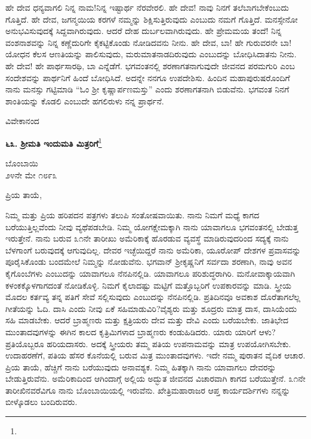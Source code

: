 ಹೇ ದೇವ ಧನ್ಯವಾಗಲಿ ನಿನ್ನ ನಾಮ!ನಿನ್ನ ಇಷ್ಟಾರ್ಥ ನೆರವೇರಲಿ. ಹೇ ದೇವ! ನಾವು ನಿನಗೆ ತಲೆಬಾಗಬೇಕೆಂಬುದು ಗೊತ್ತಿದೆ. ಹೇ ದೇವ, ಜಗನ್ಮಯಿಯ ಕರಗಳೆ ನಮ್ಮನ್ನು ಶಿಕ್ಷಿಸುತ್ತಿರುವುದು ಎಂಬುದು ನಮಗೆ ಗೊತ್ತಿದೆ. ಮನಸ್ಸೇನೋ ಅನುಭವಿಸುವುದಕ್ಕೆ ಸಿದ್ದವಾಗಿರುವುದು. ಆದರೆ ದೇಹ ದುರ್ಬಲವಾಗಿರುವುದು. ಹೇ ಪ್ರೇಮಮಯ ತಂದೆ! ನಿನ್ನ ವಂಶನಾಶವನ್ನು ನಿನ್ನ ಕಣ್ಣೆದುರಿಗೇ ಕೈಕಟ್ಟಿಕೊಂಡು ನೋಡಿದವನು ನೀನು. ಹೇ ದೇವ, ಬಾ! ಹೇ ಗುರುವರನೇ ಬಾ! ಯೋಧನ ಕೆಲಸ ಆಣತಿಯನ್ನು ಪಾಲಿಸುವುದು, ಮರುಮಾತನಾಡದಿರುವುದು ಎಂಬುದನ್ನು ಬೋಧಿಸಿದಾತನು ನೀನು. ಹೇ ದೇವ! ಹೇ ಪಾರ್ಥಸಾರಥಿ, ಬಾ ಎನ್ನೆಡೆಗೆ. ಭಗವಂತನಲ್ಲಿ ಶರಣಾಗತನಾಗುವುದೇ ಜೀವನದ ಪರಮಗುರಿ ಎಂಬ ಸಂದೇಶವನ್ನು ಪಾರ್ಥನಿಗೆ ಹಿಂದೆ ಬೋಧಿಸಿದೆ. ಅದನ್ನೇ ನನಗೂ ಉಪದೇಶಿಸು. ಹಿಂದಿನ ಮಹಾಪುರುಷರೊಂದಿಗೆ ನಾನು ಮನಸ್ಸು ಗಟ್ಟಿಮಾಡಿ “ಓಂ ಶ‍್ರೀ ಕೃಷ್ಣಾರ್ಪಣಮಸ್ತು'' ಎಂದು ಶರಣಾಗತನಾಗಿ ಬಿಡುವೆನು. ಭಗವಂತ ನಿನಗೆ ಶಾಂತಿಯನ್ನು ಕೊಡಲಿ ಎಂಬುದೇ ಹಗಲಿರುಳು ನನ್ನ ಪ್ರಾರ್ಥನೆ.

\vspace{-0.55cm}

{\flushright
ವಿವೇಕಾನಂದ\par}

\begin{center}
\textbf{೬೩. ಶ‍್ರೀಮತಿ ಇಂದುಮತಿ ಮಿತ್ರರಿಗೆ}\footnote{}
\end{center}

\vspace{-0.75cm}

\begin{flushright}
ಬೊಂಬಾಯಿ\\೨೪ನೇ ಮೇ ೧೮೯೩
\end{flushright}

\noindent
ಪ್ರಿಯ ತಾಯೆ,

ನಿಮ್ಮ ಮತ್ತು ಪ್ರಿಯ ಹರಿಪದನ ಪತ್ರಗಳು ತಲುಪಿ ಸಂತೋಷವಾಯಿತು. ನಾನು ನಿಮಗೆ ಮಧ್ಯೆ ಕಾಗದ ಬರೆಯುತ್ತಿಲ್ಲವೆಂದು ನೀವು ವ್ಯಥೆಪಡಬೇಡಿ. ನಿಮ್ಮ ಯೋಗಕ್ಷೇಮಕ್ಕಾಗಿ ನಾನು ಯಾವಾಗಲೂ ಭಗವಂತನಲ್ಲಿ ಬೇಡುತ್ತ ಇರುತ್ತೇನೆ. ನಾನು ಬರುವ ೩೧ನೇ ತಾರೀಖು ಅಮೆರಿಕಾಕ್ಕೆ ಹೊರಡುವ ವ್ಯವಸ್ಥೆ ಮಾಡಿರುವುದರಿಂದ ಸದ್ಯಕ್ಕೆ ನಾನು ಬೆಳಗಾಂಗೆ ಬರುವುದಕ್ಕೆ ಆಗುವುದಿಲ್ಲ. ದೇವರ ಇಚ್ಛೆಯಿದ್ದರೆ ನಾನು ಅಮೆರಿಕಾ, ಯೂರೋಪ್ ದೇಶಗಳ ಪ್ರವಾಸವನ್ನು ಪೂರೈಸಿಕೊಂಡು ಬಂದಮೇಲೆ ನಿಮ್ಮನ್ನು ನೋಡುವೆನು. ಭಗವಾನ್ ಶ‍್ರೀಕೃಷ್ಣನಿಗೆ ಸರ್ವದಾ ಶರಣಾಗಿ, ನಾವು ಅವನ ಕೈಗೊಂಬೆಗಳು ಎಂಬುದನ್ನು ಯಾವಾಗಲೂ ನೆನಪಿನಲ್ಲಿಡಿ. ಯಾವಾಗಲೂ ಪರಿಶುದ್ಧರಾಗಿರಿ. ಮನೋವಾಕ್ಕಾಯವಾಗಿ ಕಳಂಕಕ್ಕೊಳಗಾಗದಂತೆ ನೋಡಿಕೊಳ್ಳಿ. ನಿಮಗೆ ಕೈಲಾದಷ್ಟು ಮಟ್ಟಿಗೆ ಮತ್ತೊಬ್ಬರಿಗೆ ಉಪಕಾರವನ್ನು ಮಾಡಿ. ಸ್ತ್ರೀಯ ಮೊದಲ ಕರ್ತವ್ಯ ತನ್ನ ಪತಿಗೆ ಸೇವೆ ಸಲ್ಲಿಸುವುದು ಎಂಬುದನ್ನು ನೆನಪಿನಲ್ಲಿಡಿ. ಪ್ರತಿದಿನವೂ ಅವಕಾಶ ದೊರೆತಾಗಲೆಲ್ಲ ಗೀತೆಯನ್ನು ಓದಿ. ದಾಸಿ ಎಂದು ನೀವು ಏಕೆ ಸಹಿಮಾಡುವಿರಿ?ವೈಶ್ಯರು ಮತ್ತು ಶೂದ್ರರು ಮಾತ್ರ ದಾಸ, ದಾಸಿಯೆಂದು ಸಹಿ ಮಾಡಬೇಕು. ಆದರೆ ಬ್ರಾಹ್ಮಣರು ಮತ್ತು ಕ್ಷತ್ರಿಯರು ದೇವ ಮತ್ತು ದೇವಿ ಎಂದು ಬರೆಯಬೇಕು. ಜಾತಿಭೇದ ಮುಂತಾದವುಗಳನ್ನು ಈಗಿನ ಕಾಲದ ಕೃತ್ರಿಮಿಗಳಾದ ಬ್ರಾಹ್ಮಣರು ಕಂಡುಹಿಡಿದರು. ಯಾರು ಯಾರಿಗೆ ಆಳು? ಪ್ರತಿಯೊಬ್ಬರೂ ಹರಿಯದಾಸರು. ಅದಕ್ಕೆ ಸ್ತ್ರೀಯರು ತಮ್ಮ ಪತಿಯ ಉಪನಾಮವನ್ನು ಮಾತ್ರ ಉಪಯೋಗಿಸಬೇಕು. ಉದಾಹರಣೆಗೆ, ಪತಿಯ ಹೆಸರ ಕೊನೆಯಲ್ಲಿ ಬರುವ ಮಿತ್ರ ಮುಂತಾದವುಗಳು. ಇದೇ ನಮ್ಮ ಪುರಾತನ ವೈದಿಕ ಆಚಾರ. ಪ್ರಿಯ ತಾಯೆ, ಹೆಚ್ಚಿಗೆ ನಾನು ಬರೆಯುವುದು ಅನಾವಶ್ಯಕ. ನಿಮ್ಮ ಹಿತಕ್ಕಾಗಿ ನಾನು ಯಾವಾಗಲು ದೇವರನ್ನು ಬೇಡುತ್ತಿರುವೆನು. ಅಮೆರಿಕಾದಿಂದ ಆಗಿಂದಾಗ್ಗೆ ಅಲ್ಲಿಯ ಅದ್ಭುತ ಜೀವನದ ವಿಚಾರವಾಗಿ ಕಾಗದ ಬರೆಯುತ್ತೇನೆ. ೩೧ನೇ ತಾರೀಖಿನವರೆವಿಗೂ ನಾನು ಬೊಂಬಾಯಿಯಲ್ಲಿ ಇರುವೆನು. ಖೇತ್ರಿಮಹಾರಾಜರ ಆಪ್ತ ಕಾರ್ಯದರ್ಶಿಗಳು ನನ್ನನ್ನು ಬೀಳ್ಕೊಡಲು ಬಂದಿರುವರು.


